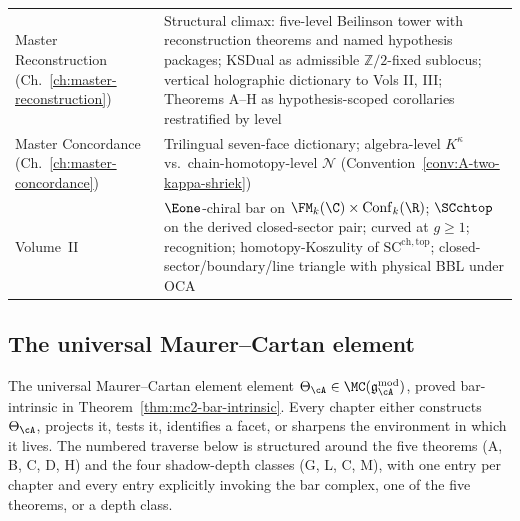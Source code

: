{\begin{longtable}{@{}p{}p{}@{}}
\hline
Master Reconstruction (Ch.~\ref{ch:master-reconstruction}) &
 Structural climax: five-level Beilinson tower with reconstruction theorems and named hypothesis packages; KSDual as admissible $\mathbb Z/2$-fixed sublocus; vertical holographic dictionary to Vols II, III; Theorems A--H as hypothesis-scoped corollaries restratified by level \\
Master Concordance (Ch.~\ref{ch:master-concordance}) &
 Trilingual seven-face dictionary; algebra-level $K^\kappa$ vs.\ chain-homotopy-level $\mathcal N$ (Convention~\ref{conv:A-two-kappa-shriek}) \\
Volume~II &
 $\Eone$-chiral bar on $\FM_k(\C)\times\operatorname{Conf}_k(\R)$; $\SCchtop$ on the derived closed-sector pair; curved at $g\ge 1$; recognition; homotopy-Koszulity of $\mathrm{SC}^{\mathrm{ch,top}}$; closed-sector/boundary/line triangle with physical BBL under OCA \\
\end{longtable}
}

\subsection{The universal Maurer--Cartan element}
\label{subsec:numbered-traverse}
%
%

The universal Maurer--Cartan element
element $\Theta_\cA \in \MC(\gAmod)$, proved bar-intrinsic
in Theorem~\ref{thm:mc2-bar-intrinsic}. Every chapter either
constructs $\Theta_\cA$, projects it, tests it, identifies a facet,
or sharpens the environment in which it lives. The numbered
traverse below is structured around the five theorems
(A, B, C, D, H) and the four shadow-depth classes (G, L, C, M), with one
entry per chapter and every entry explicitly invoking the bar
complex, one of the five theorems, or a depth class.

